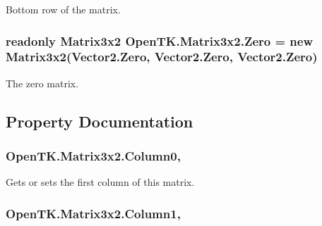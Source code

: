 Bottom row of the matrix. 

\hypertarget{struct_open_t_k_1_1_matrix3x2_a48892050acebbb8e3b2213cdab1cdc9f}{
\subsubsection[{Zero}]{\setlength{\rightskip}{0pt plus 5cm}readonly {\bf Matrix3x2} Open\-T\-K.\-Matrix3x2.\-Zero = new {\bf Matrix3x2}(Vector2.\-Zero, Vector2.\-Zero, Vector2.\-Zero)\hspace{0.3cm}{\ttfamily [static]}}}\label{struct_open_t_k_1_1_matrix3x2_a48892050acebbb8e3b2213cdab1cdc9f}


The zero matrix. 



\subsection{Property Documentation}
\hypertarget{struct_open_t_k_1_1_matrix3x2_a2a284f0363ee1882bdc3aea30a3074a2}{
\subsubsection[{Column0}]{ Open\-T\-K.\-Matrix3x2.\-Column0\hspace{0.3cm}{\ttfamily [get]}, {\ttfamily [set]}}}\label{struct_open_t_k_1_1_matrix3x2_a2a284f0363ee1882bdc3aea30a3074a2}


Gets or sets the first column of this matrix. 

\hypertarget{struct_open_t_k_1_1_matrix3x2_a4a05efc768de57bd82ad6fe12aeb5074}{
\subsubsection[{Column1}]{ Open\-T\-K.\-Matrix3x2.\-Column1\hspace{0.3cm}{\ttfamily [get]}, {\ttfamily [set]}}}\label{struct_open_t_k_1_1_matrix3x2_a4a05efc768de57bd82ad6fe12aeb5074}


